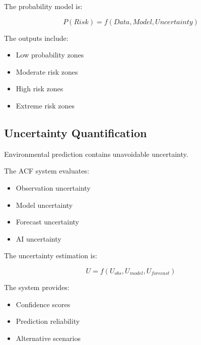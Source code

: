 The probability model is:

\[
P(Risk)=f(Data,Model,Uncertainty)
\]


The outputs include:

\begin{itemize}

\item Low probability zones

\item Moderate risk zones

\item High risk zones

\item Extreme risk zones

\end{itemize}



\subsection{Uncertainty Quantification}

Environmental prediction contains unavoidable uncertainty.

The ACF system evaluates:

\begin{itemize}

\item Observation uncertainty

\item Model uncertainty

\item Forecast uncertainty

\item AI uncertainty

\end{itemize}


The uncertainty estimation is:

\[
U=
f(U_{obs},U_{model},U_{forecast})
\]


The system provides:

\begin{itemize}

\item Confidence scores

\item Prediction reliability

\item Alternative scenarios

\end{itemize}



